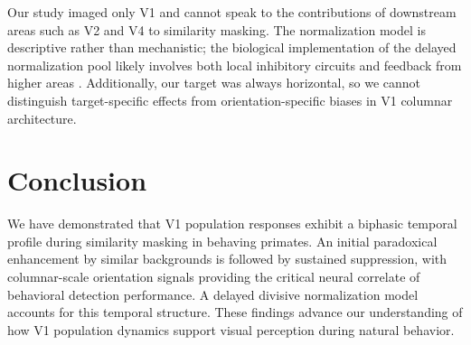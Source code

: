 \documentclass[11pt]{article}
\begin{document}
Our study imaged only V1 and cannot speak to the contributions of downstream areas such as V2 and V4 to similarity masking. The normalization model is descriptive rather than mechanistic; the biological implementation of the delayed normalization pool likely involves both local inhibitory circuits and feedback from higher areas \citep{angelucci2017}. Additionally, our target was always horizontal, so we cannot distinguish target-specific effects from orientation-specific biases in V1 columnar architecture.

\section{Conclusion}

We have demonstrated that V1 population responses exhibit a biphasic temporal profile during similarity masking in behaving primates. An initial paradoxical enhancement by similar backgrounds is followed by sustained suppression, with columnar-scale orientation signals providing the critical neural correlate of behavioral detection performance. A delayed divisive normalization model accounts for this temporal structure. These findings advance our understanding of how V1 population dynamics support visual perception during natural behavior.



\end{document}

